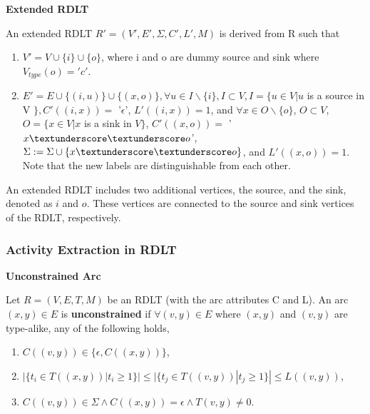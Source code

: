         \begin{definition} \textbf{Extended RDLT} \cite{malinao-rdlt}

            An extended RDLT $R' = (V',E',\Sigma,C',L',M)$ is derived from R such that

            \begin{enumerate}
                
                \item $V' = V \cup \{i\} \cup \{o\}$, where i and o are dummy source and sink where $V_{type}(o) = 'c'$.

                \item $E' = E \cup \{(i,u)\} \cup \{(x,o)\}, \forall u \in I\backslash \{i\}, I \subset V, I = \{u \in V | u$ is a source in V $\}, C'((i,x)) = $ '$\epsilon$', $L'((i,x)) = 1$, and $\forall x \in O\backslash \{o\}$, $O \subset V$, $O = \{x \in V | x$ is a sink in $V\}$, $C'((x,o)) = $ '$x\textunderscore \textunderscore o$', $\Sigma := \Sigma \cup \{x\textunderscore\textunderscore o\}$, and $L'((x,o)) = 1$. Note that the new labels are distinguishable from each other.
                
            \end{enumerate}
            
        \end{definition}

        An extended RDLT includes two additional vertices, the source, and the sink, denoted as $i$ and $o$. These vertices are connected to the source and sink vertices of the RDLT, respectively.

        \subsubsection*{Activity Extraction in RDLT}
        
        \begin{definition} \textbf{Unconstrained Arc} \cite{malinao-rdlt}

        Let $R = (V,E,T,M)$ be an RDLT (with the arc attributes C and L). An arc $(x,y) \in E$ is \textbf{unconstrained} if $\forall (v,y) \in E$ where $(x,y)$ and $(v,y)$ are type-alike, any of the following holds,

            \begin{enumerate}
                
                \item $C((v,y)) \in \{\epsilon,C((x,y))\}$,

                \item $|\{t_{i} \in T((x,y))|t_{i} \geq 1\}|\leq |\{t_{j} \in T((v,y))|t_{j} \geq 1\}| \leq L((v,y))$,

                \item $C((v,y)) \in \Sigma \wedge C((x,y)) = \epsilon \wedge T(v,y) \neq 0$.
                
            \end{enumerate}
            
        \end{definition}


